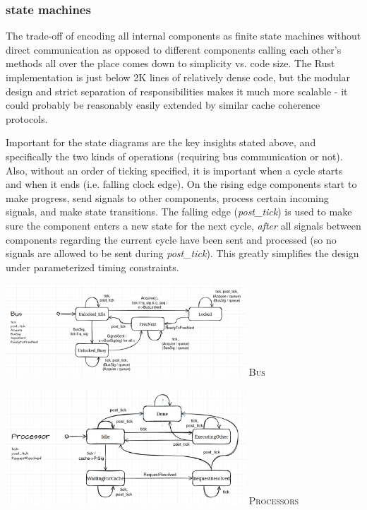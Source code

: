 \documentclass{article}
\begin{document}
\begin{multicols}{2}
\subsubsection{state machines}

The trade-off of encoding all internal components as finite state machines without direct communication as opposed to different components calling each other's methods all over the place comes down to simplicity vs. code size. The Rust implementation is just below 2K lines of relatively dense code, but the modular design and strict separation of responsibilities makes it much more scalable - it could probably be reasonably easily extended by similar cache coherence protocols.

Important for the state diagrams are the key insights stated above, and specifically the two kinds of operations (requiring bus communication or not). Also, without an order of ticking specified, it is important when a cycle starts and when it ends (i.e. falling clock edge). On the rising edge components start to make progress, send signals to other components, process certain incoming signals, and make state transitions. The falling edge (\textit{post\_tick}) is used to make sure the component enters a new state for the next cycle, \textit{after} all signals between components regarding the current cycle have been sent and processed (so no signals are allowed to be sent during \textit{post\_tick}). This greatly simplifies the design under parameterized timing constraints.

\end{multicols}
\begin{multicols}{2}

\begin{center}
\includegraphics[width=9cm]{img/state_diagram_bus.png}
\textsc{Bus}
\end{center}


\begin{center}
\includegraphics[width=9cm]{img/state_diagram_processor.png}
\textsc{Processors}
\end{center}

\end{multicols}
\end{document}
